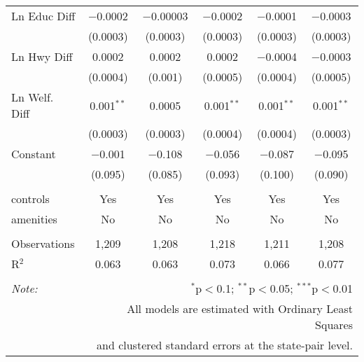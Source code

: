\begin{table}[!htbp]
\begin{tabular}{@{\extracolsep{5pt}}lccccc}
  Ln Educ Diff & $-$0.0002 & $-$0.00003 & $-$0.0002 & $-$0.0001 & $-$0.0003 \\ 
  & (0.0003) & (0.0003) & (0.0003) & (0.0003) & (0.0003) \\ 
  Ln Hwy Diff & 0.0002 & 0.0002 & 0.0002 & $-$0.0004 & $-$0.0003 \\ 
  & (0.0004) & (0.001) & (0.0005) & (0.0004) & (0.0005) \\ 
  Ln Welf. Diff & 0.001$^{**}$ & 0.0005 & 0.001$^{**}$ & 0.001$^{**}$ & 0.001$^{**}$ \\ 
  & (0.0003) & (0.0003) & (0.0004) & (0.0004) & (0.0003) \\ 
  Constant & $-$0.001 & $-$0.108 & $-$0.056 & $-$0.087 & $-$0.095 \\ 
  & (0.095) & (0.085) & (0.093) & (0.100) & (0.090) \\ 
 \hline \\[-1.8ex] 
controls & Yes & Yes & Yes & Yes & Yes \\ 
amenities & No & No & No & No & No \\ 
\hline \\[-1.8ex] 
Observations & 1,209 & 1,208 & 1,218 & 1,211 & 1,208 \\ 
R$^{2}$ & 0.063 & 0.063 & 0.073 & 0.066 & 0.077 \\ 
\hline 
\hline \\[-1.8ex] 
\textit{Note:}  & \multicolumn{5}{r}{$^{*}$p$<$0.1; $^{**}$p$<$0.05; $^{***}$p$<$0.01} \\ 
 & \multicolumn{5}{r}{All models are estimated with Ordinary Least Squares} \\ 
 & \multicolumn{5}{r}{and clustered standard errors at the state-pair level.} \\ 
\end{tabular} 
\end{table} 
